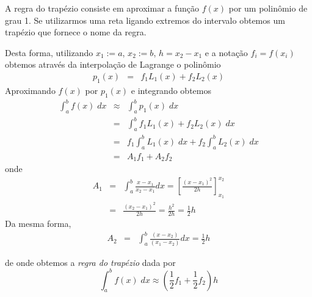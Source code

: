 A regra do trapézio consiste em aproximar a função $f(x)$ por um polinômio de grau 1. Se utilizarmos uma reta ligando extremos do intervalo obtemos um trapézio que fornece o nome da regra. 


Desta forma, utilizando $x_1:=a$,  $x_2:=b$, $h=x_2-x_1$ e a notação $f_i=f(x_i)$ obtemos através da interpolação de Lagrange o polinômio
\begin{eqnarray} 
p_1(x) &=& f_1 L_1(x)+ f_2 L_2(x) 
\end{eqnarray}
Aproximando $f(x)$ por $p_1(x)$ e integrando obtemos
\begin{eqnarray*}
  \int_a^bf(x)\;dx &\approx& \int_a^bp_1(x)\;dx \\
    &=& \int_a^b f_1L_1(x) + f_2L_2(x)\;dx \\
    &=& f_1 \int_a^b L_1(x)\;dx + f_2 \int_a^b L_2(x)\;dx \\
    &=& A_1 f_1 + A_2 f_2 
\end{eqnarray*}
onde
\begin{eqnarray*}
  A_1 &=& \int_a^b\frac{x-x_1}{x_2-x_1}dx =  \left[\frac{(x-x_1)^2}{2h}\right]_{x_1}^{x_2}\\
      &=& \frac{(x_2-x_1)^2}{2h} = \frac{h^2}{2h} = \frac{1}{2}h
\end{eqnarray*}
Da mesma forma,
\begin{eqnarray*}
  A_2 &=& \int_a^b\frac{(x-x_2)}{(x_1-x_2)}dx = \frac{1}{2}h
\end{eqnarray*}


de onde obtemos a \emph{regra do trapézio} dada por
\begin{equation}
  \int_a^b f(x)\;dx \approx \left(\frac{1}{2}f_1 + \frac{1}{2}f_2\right)h 
\end{equation}


